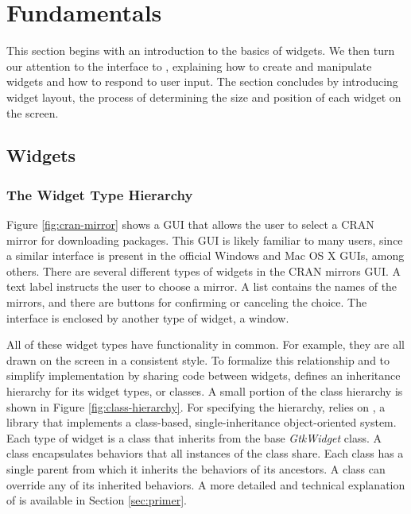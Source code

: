 \documentclass[article]{jss}
\begin{document}
\section{Fundamentals}

This section begins with an introduction to the basics of  widgets.
We then turn our attention to the  interface to 
, explaining how to create and manipulate widgets and how to respond to
user input. The section concludes by introducing widget layout, the process
of determining the size and position of each widget on the screen.


\subsection[GTK+ Widgets]{ Widgets}

\subsubsection{The Widget Type Hierarchy}

Figure \ref{fig:cran-mirror} shows a  GUI that allows the user to
select a CRAN mirror for downloading  packages.
This GUI is likely familiar to many  users, since a similar interface
is present in the official Windows and Mac OS X  GUIs, among others.
There are several different types of widgets in the CRAN mirrors GUI. A
text label instructs the user to choose a mirror.  A list contains the 
names of the mirrors, and there are buttons for confirming or canceling the choice. 
The interface is enclosed by another type of widget, a window. 

All of these widget types have functionality in common. For example, they are
all drawn on the screen in a consistent style. To formalize this relationship 
and to simplify implementation by sharing code
between widgets,  defines an inheritance hierarchy for its widget
types, or classes. A small portion of the  class hierarchy is shown
in Figure \ref{fig:class-hierarchy}. For specifying the hierarchy,  
relies on , a  library that implements a class-based, single-inheritance 
object-oriented system.  Each type of  widget is a  
class that inherits from the base \emph{GtkWidget} class. A  
class encapsulates behaviors that all instances of the class share. 
Each class has a single parent from which it inherits 
the behaviors of its ancestors. A class can override any of its inherited behaviors.
A more detailed and technical explanation of  is available in 
Section \ref{sec:primer}. 
\end{document}
